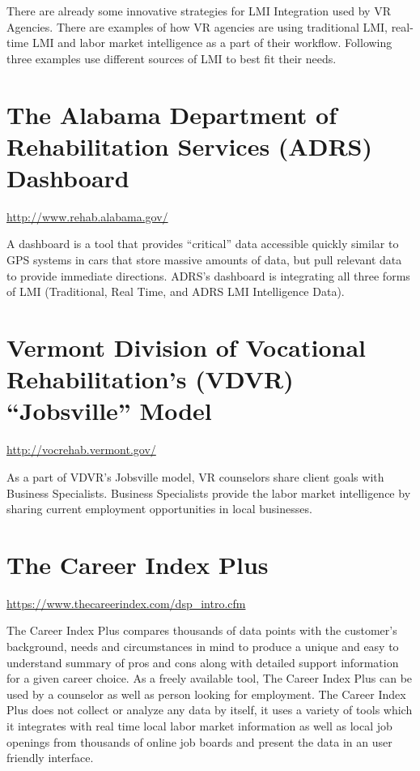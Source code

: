 \documentclass[]{book}
\theoremstyle{definition}
\theoremstyle{definition}
\theoremstyle{definition}
\theoremstyle{remark}
\begin{document}
There are already some innovative strategies for LMI Integration used by
VR Agencies. There are examples of how VR agencies are using traditional
LMI, real-time LMI and labor market intelligence as a part of their
workflow. Following three examples use different sources of LMI to best
fit their needs.

\section{The Alabama Department of Rehabilitation Services (ADRS)
Dashboard}\label{the-alabama-department-of-rehabilitation-services-adrs-dashboard}

\url{http://www.rehab.alabama.gov/}

A dashboard is a tool that provides ``critical'' data accessible quickly
similar to GPS systems in cars that store massive amounts of data, but
pull relevant data to provide immediate directions. ADRS's dashboard is
integrating all three forms of LMI (Traditional, Real Time, and ADRS LMI
Intelligence Data).

\section{\texorpdfstring{Vermont Division of Vocational Rehabilitation's
(VDVR) ``Jobsville''
Model}{Vermont Division of Vocational Rehabilitation's (VDVR) Jobsville Model}}\label{vermont-division-of-vocational-rehabilitations-vdvr-jobsville-model}

\url{http://vocrehab.vermont.gov/}

As a part of VDVR's Jobsville model, VR counselors share client goals
with Business Specialists. Business Specialists provide the labor market
intelligence by sharing current employment opportunities in local
businesses.

\section{The Career Index Plus}\label{the-career-index-plus}

\url{https://www.thecareerindex.com/dsp_intro.cfm}

The Career Index Plus compares thousands of data points with the
customer's background, needs and circumstances in mind to produce a
unique and easy to understand summary of pros and cons along with
detailed support information for a given career choice. As a freely
available tool, The Career Index Plus can be used by a counselor as well
as person looking for employment. The Career Index Plus does not collect
or analyze any data by itself, it uses a variety of tools which it
integrates with real time local labor market information as well as
local job openings from thousands of online job boards and present the
data in an user friendly interface.
\end{document}
